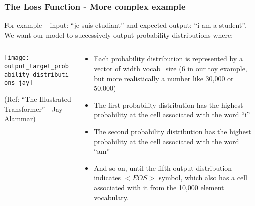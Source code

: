 \begin{frame}[fragile]\frametitle{The Loss Function - More complex example}

For example – input: ``je suis etudiant'' and expected output: ``i am a student''. We want our model to successively output probability distributions where:

\begin{columns}
    \begin{column}[T]{0.5\linewidth}
\begin{center}
\texttt{[image: output\_target\_probability\_distributions\_jay]}


{\tiny (Ref: ``The Illustrated Transformer'' - Jay Alammar)}
\end{center}		

		\end{column}
    \begin{column}[T]{0.5\linewidth}

\begin{itemize}
\item Each probability distribution is represented by a vector of width vocab\_size (6 in our toy example, but more realistically a number like 30,000 or 50,000)
\item The first probability distribution has the highest probability at the cell associated with the word ``i''
\item The second probability distribution has the highest probability at the cell associated with the word ``am''
\item And so on, until the fifth output distribution indicates $<EOS>$ symbol, which also has a cell associated with it from the 10,000 element vocabulary.
\end{itemize}
    \end{column}
  \end{columns}	

\end{frame}



